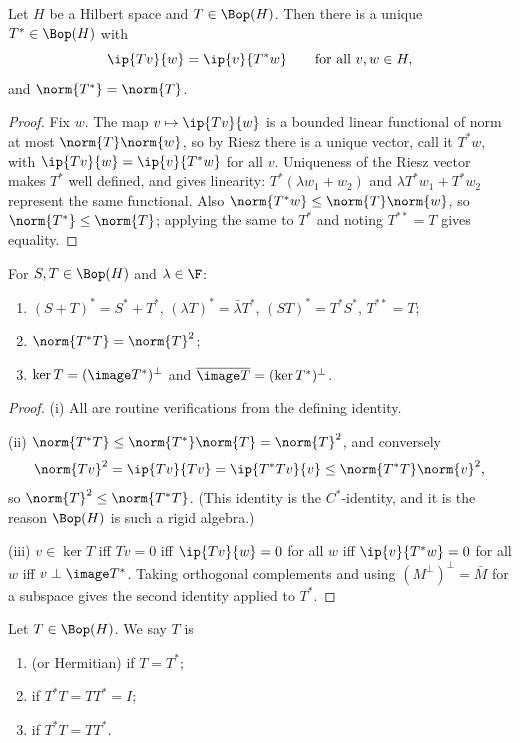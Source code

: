 \begin{proposition}
	Let $H$ be a Hilbert space and $T \in \Bop(H)$. Then there is a unique $T^* \in \Bop(H)$ with
	$$\ip{Tv}{w} = \ip{v}{T^*w} \qquad \text{for all } v,w \in H,$$
	and $\norm{T^*}=\norm{T}$.
\end{proposition}

\begin{proof}
	Fix $w$. The map $v \mapsto \ip{Tv}{w}$ is a bounded linear functional of norm at most $\norm{T}\norm{w}$, so by Riesz there is a unique vector, call it $T^*w$, with $\ip{Tv}{w}=\ip{v}{T^*w}$ for all $v$. Uniqueness of the Riesz vector makes $T^*$ well defined, and gives linearity: $T^*(\lambda w_1+w_2)$ and $\lambda T^*w_1 + T^*w_2$ represent the same functional. Also $\norm{T^*w}\leq\norm{T}\norm{w}$, so $\norm{T^*}\leq\norm{T}$; applying the same to $T^*$ and noting $T^{**}=T$ gives equality.
\end{proof}

\begin{proposition}
	For $S,T\in\Bop(H)$ and $\lambda \in \F$:
	\begin{enumerate}[label=(\roman*)]
		\item $(S+T)^*=S^*+T^*$, $(\lambda T)^* = \bar\lambda T^*$, $(ST)^*=T^*S^*$, $T^{**}=T$;
		\item $\norm{T^*T} = \norm{T}^2$;
		\item $\ker T = (\image T^*)^\perp$ and $\overline{\image T} = (\ker T^*)^\perp$.
	\end{enumerate}
\end{proposition}

\begin{proof}
	(i) All are routine verifications from the defining identity.

	(ii) $\norm{T^*T}\leq\norm{T^*}\norm{T}=\norm{T}^2$, and conversely
	$$\norm{Tv}^2 = \ip{Tv}{Tv} = \ip{T^*Tv}{v}\leq\norm{T^*T}\norm{v}^2,$$
	so $\norm{T}^2\leq\norm{T^*T}$. (This identity is the $C^*$-identity, and it is the reason $\Bop(H)$ is such a rigid algebra.)

	(iii) $v \in \ker T$ iff $Tv = 0$ iff $\ip{Tv}{w}=0$ for all $w$ iff $\ip{v}{T^*w}=0$ for all $w$ iff $v \perp \image T^*$. Taking orthogonal complements and using $(M^\perp)^\perp = \bar M$ for a subspace gives the second identity applied to $T^*$.
\end{proof}

\begin{definition}
	Let $T \in \Bop(H)$. We say $T$ is
	\begin{enumerate}[label=(\roman*)]
		\item {} (or Hermitian) if $T = T^*$;
		\item {} if $T^*T = TT^* = I$;
		\item {} if $T^*T = TT^*$.
	\end{enumerate}
\end{definition}

